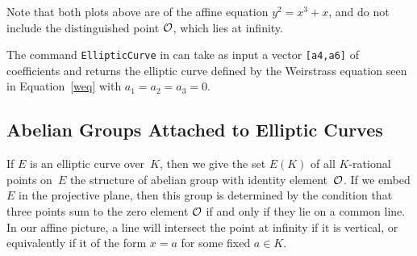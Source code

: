 Note that both plots above are of the affine equation $y^2 = x^3 + x$,
and do not include the distinguished point $\mathcal{O}$, which lies at
infinity.

\begin{remark}
The command {\tt{EllipticCurve}} in \Sage
can take as input a vector {\tt{[a4,a6]}}
of coefficients and returns the elliptic curve defined
by the Weirstrass equation seen in Equation~\ref{weq}
with $a_1=a_2=a_3=0$.
\end{remark}

\subsection{Abelian Groups Attached to Elliptic Curves}
If $E$ is an elliptic curve over~$K$, then we give the set
$E(K)$ of all $K$-rational points on~$E$ the structure of abelian
group with identity element~$\mathcal{O}$.  If we embed $E$ in the projective
plane, then this group is determined by the condition that three
points sum to the zero element $\mathcal{O}$ if and only if they lie on a
common line.
In our affine picture, a line will intersect the point at infinity
if it is vertical, or equivalently if it of the form $x=a$ for
some fixed $a\in K$.


